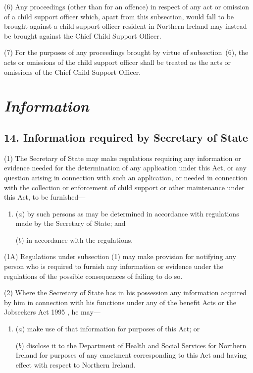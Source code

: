 \documentclass[12pt,a4paper]{article}
\begin{document}
(6) Any proceedings (other than for an offence) in respect of any act or omission of a child support officer which, apart from this subsection, would fall to be brought against a child support officer resident in Northern Ireland may instead be brought against the Chief Child Support Officer.

(7) For the purposes of any proceedings brought by virtue of subsection~(6), the acts or omissions of the child support officer shall be treated as the acts or omissions of the Chief Child Support Officer.


\section{\itshape Information}

\subsection{14. Information required by Secretary of State}

(1) The Secretary of State may make regulations requiring any information or evidence needed for the determination of any application under this Act, or any question arising in connection with such an application, or needed in connection with the collection or enforcement of child support or other maintenance under this Act, to be furnished—
\begin{enumerate}\item[]
($a$) by such persons as may be determined in accordance with regulations made by the Secretary of State; and

($b$) in accordance with the regulations.
\end{enumerate}

(1A) Regulations under subsection (1) may make provision for notifying any person who is required to furnish any information or evidence under the regulations of the possible consequences of failing to do so.

(2) Where the Secretary of State has in his possession any information acquired by him in connection with his functions under any of the benefit Acts
or the Jobseekers Act 1995%
, he may—
\begin{enumerate}\item[]
($a$) make use of that information for purposes of this Act; or

($b$) disclose it to the Department of Health and Social Services for Northern Ireland for purposes of any enactment corresponding to this Act and having effect with respect to Northern Ireland.
\end{enumerate}
\end{document}
